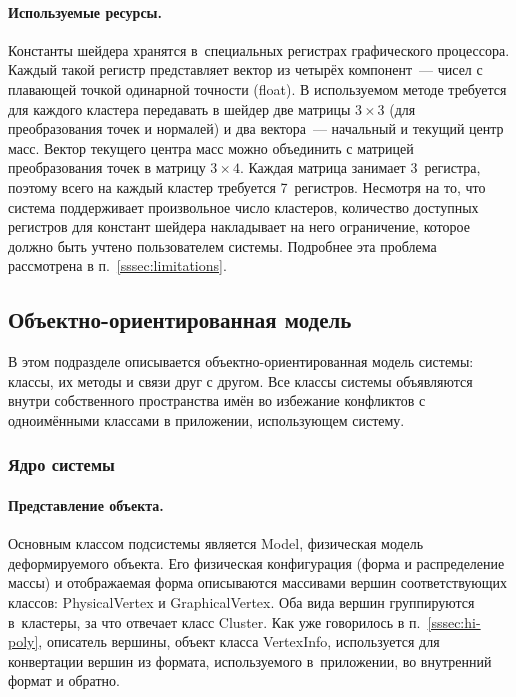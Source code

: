 \documentclass[a4paper, 14pt, titlepage]{extarticle}
\begin{document}
        \paragraph{Используемые ресурсы.}
        Константы шейдера хранятся в~специальных регистрах графического процессора. Каждый такой регистр
        представляет вектор из четырёх компонент~--- чисел с плавающей точкой одинарной точности
        (float). В используемом методе требуется для каждого
        кластера передавать в шейдер две матрицы $3 \times 3$ (для преобразования точек и нормалей) и два
        вектора~--- начальный и текущий центр масс. Вектор текущего центра масс можно объединить с
        матрицей преобразования точек в матрицу $3 \times 4$. Каждая матрица занимает 3~регистра,
        поэтому всего на каждый кластер требуется 7~регистров. Несмотря на то, что система
        поддерживает произвольное число кластеров, количество доступных регистров для констант
        шейдера накладывает на него ограничение, которое должно быть учтено пользователем системы.
        Подробнее эта проблема рассмотрена в п.~\ref{sssec:limitations}.

    \subsection{Объектно-ориентированная модель}\label{ssec:impl}

      В этом подразделе описывается объектно-ориентированная модель системы: классы, их методы и
      связи друг с другом. Все классы системы объявляются внутри собственного пространства имён во
      избежание конфликтов с одноимёнными классами в приложении, использующем систему.

      \subsubsection{Ядро системы}\label{sssec:impl_core}

        \paragraph{Представление объекта.}
        Основным классом подсистемы является Model, физическая модель деформируемого объекта.
        Его физическая конфигурация (форма и распределение массы) и отображаемая форма описываются
        массивами вершин соответствующих классов: PhysicalVertex и GraphicalVertex. Оба вида вершин
        группируются в~кластеры, за что отвечает класс Cluster. Как уже говорилось в
        п.~\ref{sssec:hi-poly}, описатель вершины, объект класса VertexInfo, используется для
        конвертации вершин из формата, используемого в~приложении, во внутренний формат и обратно.
\end{document}
